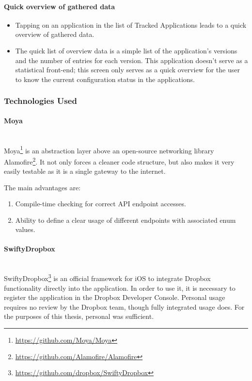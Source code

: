 \paragraph{Quick overview of gathered data}

\begin{itemize}
	\item Tapping on an application in the list of Tracked Applications leads to a quick overview of gathered data.
	\item The quick list of overview data is a simple list of the application's versions and the number of entries for each version. This application doesn't serve as a statistical front-end; this screen only serves as a quick overview for the user to know the current configuration status in the applications.
\end{itemize}

\subsubsection{Technologies Used}

\paragraph{Moya}\mbox{}\\
Moya\footnote{\url{https://github.com/Moya/Moya}} is an abstraction layer above an open-source networking library Alamofire\footnote{\url{https://github.com/Alamofire/Alamofire}}. It not only forces a cleaner code structure, but also makes it very easily testable as it is a single gateway to the internet.

The main advantages are:

\begin{enumerate}
	\item Compile-time checking for correct API endpoint accesses.
	\item Ability to define a clear usage of different endpoints with associated enum values.
\end{enumerate}

\paragraph{SwiftyDropbox}\mbox{}\\
SwiftyDropbox\footnote{\url{https://github.com/dropbox/SwiftyDropbox}} is an official framework for iOS to integrate Dropbox functionality directly into the application. In order to use it, it is necessary to register the application in the Dropbox Developer Console. Personal usage requires no review by the Dropbox team, though fully integrated usage does. For the purposes of this thesis, personal was sufficient.

